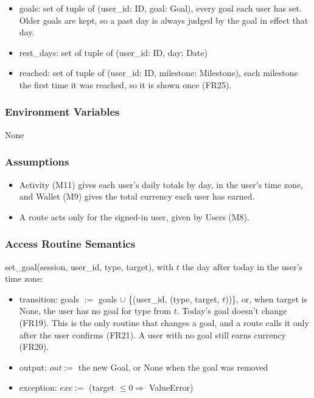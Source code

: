 \documentclass[12pt, titlepage]{article}
\begin{document}
\begin{itemize}
\item goals: set of tuple of (user\_id: ID, goal: Goal), every goal each user
  has set. Older goals are kept, so a past day is always judged by the goal in
  effect that day.
\item rest\_days: set of tuple of (user\_id: ID, day: Date)
\item reached: set of tuple of (user\_id: ID, milestone: Milestone), each
  milestone the first time it was reached, so it is shown once (FR25).
\end{itemize}

\subsubsection{Environment Variables}

None

\subsubsection{Assumptions}

\begin{itemize}
\item Activity (M11) gives each user's daily totals by day, in the user's time
  zone, and Wallet (M9) gives the total currency each user has earned.
\item A route acts only for the signed-in user, given by Users (M8).
\end{itemize}

\subsubsection{Access Routine Semantics}

\noindent set\_goal(session, user\_id, type, target), with $t$ the day after
today in the user's time zone:
\begin{itemize}
\item transition: goals $:=$ goals $\cup$ \{(user\_id, (type, target, $t$))\},
  or, when target is None, the user has no goal for type from $t$. Today's goal
  doesn't change (FR19). This is the only routine that changes a goal, and a
  route calls it only after the user confirms (FR21). A user with no goal
  still earns currency (FR20).
\item output: $out :=$ the new Goal, or None when the goal was removed
\item exception: $exc :=$ (target $\le 0 \Rightarrow$ ValueError)
\end{itemize}
\end{document}
